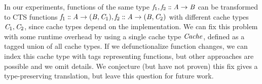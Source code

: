 







\label{sec:hiding-cache-type}

In our experiments, functions of the same type \ensuremath{\Varid{f}_{1},\Varid{f}_{2}\mathrel{:\mkern-1mu:}\Conid{A}\to \Conid{B}} can be
transformed to CTS functions \ensuremath{\Varid{f}_{1}\mathrel{:\mkern-1mu:}\Conid{A}\to (\Conid{B},\Conid{C}_{1}),\Varid{f}_{2}\mathrel{:\mkern-1mu:}\Conid{A}\to (\Conid{B},\Conid{C}_{2})} with
different cache types \ensuremath{\Conid{C}_{1},\Conid{C}_{2}}, since cache types depend on the implementation.
We can fix this problem with some runtime overhead by using a single cache type \ensuremath{\Conid{Cache}},
defined as a tagged union of all cache types. If we defunctionalize function
changes, we can index this cache type with tags representing functions, but
other approaches are possible and we omit details.
We conjecture (but have not proven) this fix gives a type-preserving
translation, but leave this question for future work.

